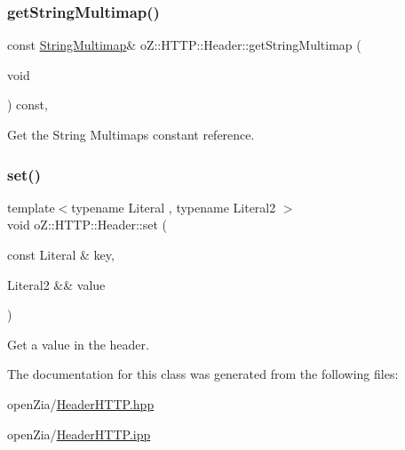 \subsubsection{\texorpdfstring{getStringMultimap()}{getStringMultimap()}\hspace{0.1cm}{\footnotesize\ttfamily [2/2]}}
{\footnotesize\ttfamily const \mbox{\hyperlink{namespaceo_z_1_1_h_t_t_p_a339aac279d709cfa16148ad073500fc1}{String\+Multimap}}\& o\+Z\+::\+H\+T\+T\+P\+::\+Header\+::get\+String\+Multimap (\begin{DoxyParamCaption}\item[{void}]{ }\end{DoxyParamCaption}) const\hspace{0.3cm}{\ttfamily [inline]}, {\ttfamily [noexcept]}}



Get the String Multimap\textquotesingle{}s constant reference. 

\mbox{\label{classo_z_1_1_h_t_t_p_1_1_header_a3063660c3eb22844296e83807b8a62e1}} 
\subsubsection{\texorpdfstring{set()}{set()}}
{\footnotesize\ttfamily template$<$typename Literal , typename Literal2 $>$ \\
void o\+Z\+::\+H\+T\+T\+P\+::\+Header\+::set (\begin{DoxyParamCaption}\item[{const Literal \&}]{key,  }\item[{Literal2 \&\&}]{value }\end{DoxyParamCaption})\hspace{0.3cm}{\ttfamily [inline]}}



Get a value in the header. 



The documentation for this class was generated from the following files\+:\begin{DoxyCompactItemize}
\item 
open\+Zia/\mbox{\hyperlink{_header_h_t_t_p_8hpp}{Header\+H\+T\+T\+P.\+hpp}}\item 
open\+Zia/\mbox{\hyperlink{_header_h_t_t_p_8ipp}{Header\+H\+T\+T\+P.\+ipp}}\end{DoxyCompactItemize}
